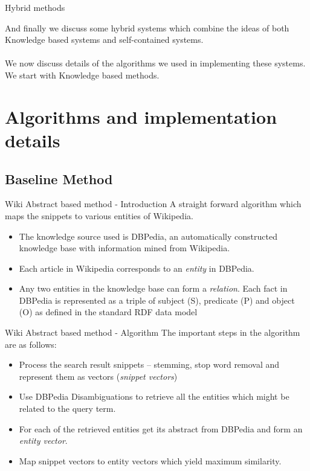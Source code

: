 \documentclass{beamer}
\begin{document}
\begin{frame}{Hybrid methods}

And finally we discuss some hybrid systems which combine the ideas of
both Knowledge based systems and self-contained systems. \\~\\

We now discuss details of the algorithms we used in implementing these
systems. We start with Knowledge based methods.
\end{frame}

\section{Algorithms and implementation details}
\subsection{Baseline Method}
\begin{frame}{Wiki Abstract based method - Introduction}
A straight forward algorithm which maps the snippets to various
entities of Wikipedia. \\
\begin{itemize}
\item The knowledge source used is DBPedia, an automatically
  constructed knowledge base with information mined from Wikipedia.
\item Each article in Wikipedia corresponds to an {\it entity} in
  DBPedia. 
\item Any two entities in the knowledge base can form a {\it
  relation}. Each fact in DBPedia is represented as a triple of
  subject (S), predicate (P) and object (O) as defined in the standard
  RDF data model
\end{itemize}
\end{frame}

\begin{frame}{Wiki Abstract based method - Algorithm}
The important steps in the algorithm are as follows: \\
\begin{itemize}
  \item Process the search result snippets -- stemming, stop word
    removal and represent them as vectors ({\it snippet vectors})
  \item Use DBPedia Disambiguations to retrieve all the entities which
    might be related to the query term.
  \item For each of the retrieved entities get its abstract from
    DBPedia and form an {\it entity vector}.
  \item Map snippet vectors to entity vectors which yield maximum
    similarity.
\end{itemize}
\end{frame}
\end{document}
